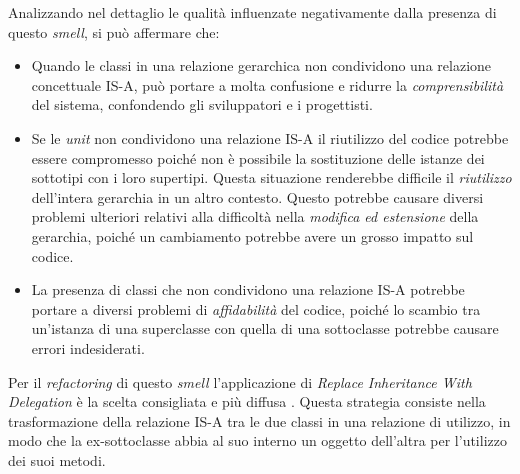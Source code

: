        Analizzando nel dettaglio le qualità influenzate negativamente dalla presenza di questo \textit{smell}, si può affermare che:
        \begin{itemize}
            \item Quando le classi in una relazione gerarchica non condividono una relazione concettuale IS-A, può portare a molta confusione e ridurre la \textit{comprensibilità} del sistema, confondendo gli sviluppatori e i progettisti.
            
            \item Se le \textit{unit} non condividono una relazione IS-A il riutilizzo del codice potrebbe essere compromesso poiché non è possibile la sostituzione delle istanze dei sottotipi con i loro supertipi. Questa situazione renderebbe difficile il \textit{riutilizzo} dell'intera gerarchia in un altro contesto. Questo potrebbe causare diversi problemi ulteriori relativi alla difficoltà nella \textit{modifica ed estensione} della gerarchia, poiché un cambiamento potrebbe avere un grosso impatto sul codice.
            
            \item La presenza di classi che non condividono una relazione IS-A potrebbe portare a diversi problemi di \textit{affidabilità} del codice, poiché lo scambio tra un'istanza di una superclasse con quella di una sottoclasse potrebbe causare errori indesiderati.
        \end{itemize}
        
        Per il \textit{refactoring} di questo \textit{smell} l'applicazione di \textit{Replace Inheritance With Delegation} è la scelta consigliata e più diffusa \cite{SURYANARAYANA201521}. Questa strategia consiste nella trasformazione della relazione IS-A tra le due classi in una relazione di utilizzo, in modo che la ex-sottoclasse abbia al suo interno un oggetto dell'altra per l'utilizzo dei suoi metodi.
        
    
